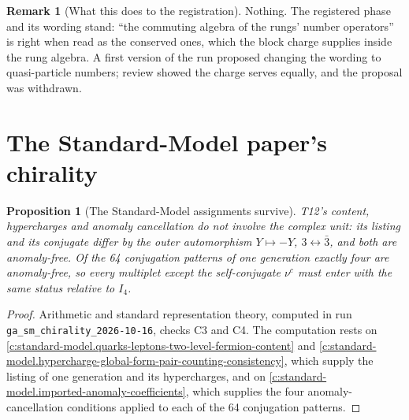 \documentclass[11pt]{article}
\newtheorem{proposition}[theorem]{Proposition}
\theoremstyle{definition}
\newtheorem{remark}[theorem]{Remark}
\theoremstyle{plain}
\begin{document}
\begin{remark}[What this does to the registration]\label{c:note.field-theory.what-does-registration}
Nothing. The registered phase and its wording stand: ``the commuting algebra of the rungs' number operators'' is right when read as the conserved ones, which the block charge supplies inside the rung algebra. A first version of the run proposed changing the wording to quasi-particle numbers; review showed the charge serves equally, and the proposal was withdrawn.
\end{remark}

\section{The Standard-Model paper's chirality}

\begin{proposition}[The Standard-Model assignments survive]\label{c:field-theory.assignments-survive}
T12's content, hypercharges and anomaly cancellation do not involve the complex unit: its listing and its conjugate differ by the outer automorphism $Y \mapsto -Y$, $3 \leftrightarrow \bar 3$, and both are anomaly-free. Of the 64 conjugation patterns of one generation exactly four are anomaly-free, so every multiplet except the self-conjugate $\nu^c$ must enter with the same status relative to $I_4$.
\end{proposition}
\begin{proof}
Arithmetic and standard representation theory, computed in run \texttt{ga\_sm\_chirality\_2026-10-16}, checks C3 and C4. The computation rests on \ref{c:standard-model.quarks-leptons-two-level-fermion-content} and \ref{c:standard-model.hypercharge-global-form-pair-counting-consistency}, which supply the listing of one generation and its hypercharges, and on \ref{c:standard-model.imported-anomaly-coefficients}, which supplies the four anomaly-cancellation conditions applied to each of the 64 conjugation patterns.

\end{proof}
\end{document}
